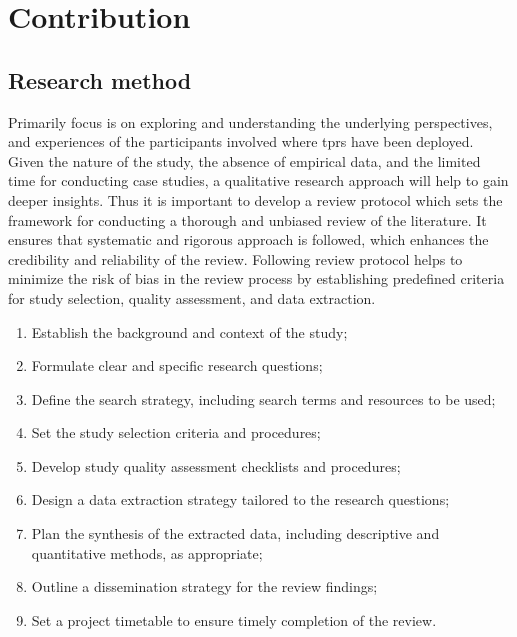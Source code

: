 
\newpage


\section{Contribution}


\subsection{Research method}

Primarily focus is on exploring and understanding the underlying perspectives, and experiences of the participants involved where \ac{tprs} have been deployed. Given
the nature of the study, the absence of empirical data, and the limited time for conducting case studies, a qualitative research approach
will help to gain deeper insights. Thus it is important to develop a review protocol which sets the framework for conducting a thorough and
unbiased review of the literature. It ensures that
systematic and rigorous approach is followed, which enhances the credibility and reliability of the review. Following review protocol helps
to minimize the risk of bias in the review process by establishing predefined criteria for study selection, quality assessment, and data
extraction.

\begin{enumerate}
  \item Establish the background and context of the study;
  \item Formulate clear and specific research questions;
  \item Define the search strategy, including search terms and resources to be used;
  \item Set the study selection criteria and procedures;
  \item Develop study quality assessment checklists and procedures;
  \item Design a data extraction strategy tailored to the research questions;
  \item Plan the synthesis of the extracted data, including descriptive and quantitative methods, as appropriate;
  \item Outline a dissemination strategy for the review findings;
  \item Set a project timetable to ensure timely completion of the review. \cite[4-5]{systematic_review_2004}
\end{enumerate}

